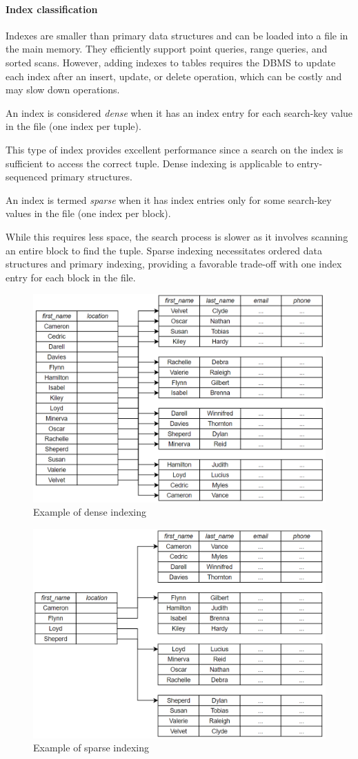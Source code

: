 \paragraph*{Index classification}
Indexes are smaller than primary data structures and can be loaded into a file in the main memory.
They efficiently support point queries, range queries, and sorted scans. 
However, adding indexes to tables requires the DBMS to update each index after an insert, update, or delete operation, which can be costly and may slow down operations.

\begin{definition}
    An index is considered \emph{dense} when it has an index entry for each search-key value in the file (one index per tuple). 
\end{definition}
This type of index provides excellent performance since a search on the index is sufficient to access the correct tuple. 
Dense indexing is applicable to entry-sequenced primary structures.
\newpage
\begin{definition}
    An index is termed \emph{sparse} when it has index entries only for some search-key values in the file (one index per block). 
\end{definition}
While this requires less space, the search process is slower as it involves scanning an entire block to find the tuple. 
Sparse indexing necessitates ordered data structures and primary indexing, providing a favorable trade-off with one index entry for each block in the file.
\begin{figure}[H]
    \centering
    \includegraphics[width=0.5\linewidth]{images/dense.png}
    \caption{Example of dense indexing}
\end{figure} 
\begin{figure}[H]
    \centering
    \includegraphics[width=0.5\linewidth]{images/sparse.png}
    \caption{Example of sparse indexing}
\end{figure} 

